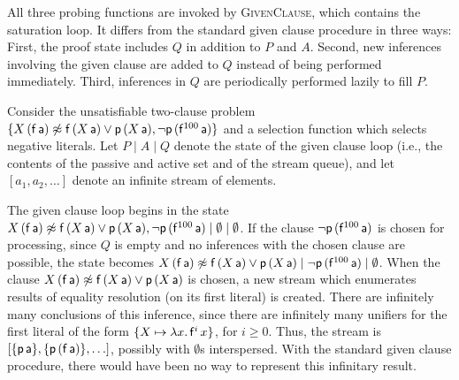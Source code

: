 \documentclass[smallcondensed,draft]{svjour3}     %
\begin{document}
All three probing functions are invoked by
\textsc{GivenClause}, which contains the saturation loop. It differs
from the standard given clause procedure in three ways:
First, the proof state includes $Q$ in addition to $P$ and $A$. Second,
new inferences involving the given clause are added to $Q$ instead of being
performed immediately. Third, inferences in $Q$ are periodically performed
lazily to fill $P$.

\newcommand\infstream[1]{[#1]}

\begin{exa} 
  \begin{sloppypar}
  Consider the unsatisfiable two-clause problem $\{ X \, (\mathsf{f} \,
  \mathsf{a}) \not\approx \mathsf{f} \, (X \, \mathsf{a}) \lor \mathsf{p} \, (X \, \mathsf{a}),\allowbreak
  \neg \mathsf{p} \, (\mathsf{f}^{100} \, \mathsf{a})  \}$ and a selection function which
  selects negative literals.
  Let $P \mid A \mid Q$ denote
  the state of the given clause loop (i.e., the contents of the passive and active set
  and of the stream queue), and let $\infstream{ a_1, a_2, \ldots }$
  denote an infinite stream of elements.
  \end{sloppypar}

  The given clause loop begins in the state $X \, (\mathsf{f} \, \mathsf{a}) \not\approx
  \mathsf{f} \, (X \, \mathsf{a}) \lor \mathsf{p} \, (X \, \mathsf{a}), \neg \mathsf{p} \,
  (\mathsf{f}^{100} \, \mathsf{a}) \mid \emptyset \mid \emptyset$. If the clause $\neg
  \mathsf{p} \, (\mathsf{f}^{100} \, \mathsf{a})$ is chosen for processing, since $Q$ is empty
  and no inferences with the chosen clause are possible, the state becomes $X \,
  (\mathsf{f} \, \mathsf{a}) \not\approx \mathsf{f} \, (X \, \mathsf{a}) \lor \mathsf{p} \, (X \,
  \mathsf{a}) \mid \neg \mathsf{p} \, (\mathsf{f}^{100} \, \mathsf{a}) \mid \emptyset$. When
  the clause $X \, (\mathsf{f} \, \mathsf{a}) \not\approx \mathsf{f} \, (X \, \mathsf{a}) \lor
  \mathsf{p} \, (X \, \mathsf{a})$ is chosen, a new stream which enumerates results of
  equality resolution (on its first literal) is created. There are infinitely many
  conclusions of this inference, since there are infinitely many unifiers for the
  first literal of the form $\{ X \mapsto \lambda x. \, \mathsf{f}^i \, x \}$, for
  $i \geq 0$. Thus, the stream is $\infstream{ \{\cst{p} \, \cst{a}\}, \{\cst{p} \, (\cst{f}\,\cst{a})\}, \ldots }$,
  possibly with $\emptyset$s interspersed. With the standard given clause procedure,
  there would have been no way to represent this infinitary result.


\end{exa}
\end{document}
